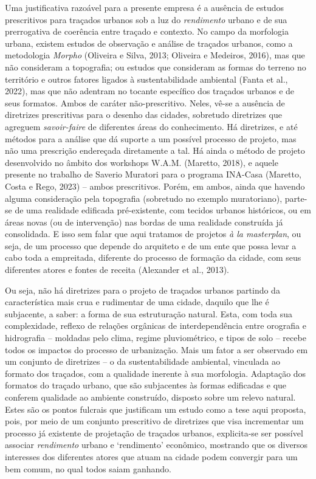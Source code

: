 \documentclass[]{report}
\begin{document}
	Uma justificativa razoável para a presente empresa é a ausência de estudos prescritivos para traçados urbanos sob a luz do \textit{rendimento} urbano e de sua prerrogativa de coerência entre traçado e contexto. No campo da morfologia urbana, existem estudos de observação e análise de traçados urbanos, como a metodologia \textit{Morpho} (Oliveira e Silva, 2013; Oliveira e Medeiros, 2016), mas que não consideram a topografia; ou estudos que consideram as formas do terreno no território e outros fatores ligados à sustentabilidade ambiental (Fanta et al., 2022), mas que não adentram no tocante específico dos traçados urbanos e de seus formatos. Ambos de caráter não-prescritivo. Neles, vê-se a ausência de diretrizes prescritivas para o desenho das cidades, sobretudo diretrizes que agreguem \textit{savoir-faire} de diferentes áreas do conhecimento. Há diretrizes, e até métodos para a análise que dá suporte a um possível processo de projeto, mas não uma prescrição endereçada diretamente a tal. Há ainda o método de projeto desenvolvido no âmbito dos workshops W.A.M. (Maretto, 2018), e aquele presente no trabalho de Saverio Muratori para o programa INA-Casa (Maretto, Costa e Rego, 2023) – ambos prescritivos. Porém, em ambos, ainda que havendo alguma consideração pela topografia (sobretudo no exemplo muratoriano), parte-se de uma realidade edificada pré-existente, com tecidos urbanos históricos, ou em áreas novas (ou de intervenção) nas bordas de uma realidade construída já consolidada. E isso sem falar que aqui tratamos de projetos \textit{à la masterplan}, ou seja, de um processo que depende do arquiteto e de um ente que possa levar a cabo toda a empreitada, diferente do processo de formação da cidade, com seus diferentes atores e fontes de receita (Alexander et al., 2013).

	Ou seja, não há diretrizes para o projeto de traçados urbanos partindo da característica mais crua e rudimentar de uma cidade, daquilo que lhe é subjacente, a saber: a forma de sua estruturação natural. Esta, com toda sua complexidade, reflexo de relações orgânicas de interdependência entre orografia e hidrografia – moldadas pelo clima, regime pluviométrico, e tipos de solo – recebe todos os impactos do processo de urbanização. Mais um fator a ser observado em um conjunto de diretrizes – o da sustentabilidade ambiental, vinculada ao formato dos traçados, com a qualidade inerente à sua morfologia. Adaptação dos formatos do traçado urbano, que são subjacentes às formas edificadas e que conferem qualidade ao ambiente construído, disposto sobre um relevo natural. Estes são os pontos fulcrais que justificam um estudo como a tese aqui proposta, pois, por meio de um conjunto prescritivo de diretrizes que visa incrementar um processo já existente de projetação de traçados urbanos, explicita-se ser possível associar \textit{rendimento} urbano e ‘rendimento’ econômico, mostrando que os diversos interesses dos diferentes atores que atuam na cidade podem convergir para um bem comum, no qual todos saiam ganhando.
\end{document}

